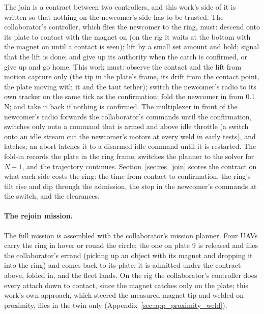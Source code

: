 The join is a contract between two controllers, and this work's side of it is written so that nothing on the
newcomer's side has to be trusted. The collaborator's controller, which flies the newcomer to the ring, must:
descend onto its plate to contact with the magnet on (on the rig it waits at the bottom with the magnet on until a
contact is seen); lift by a small set amount and hold; signal that the lift is done; and give up its authority when
the catch is confirmed, or give up and go home. This work must: observe the contact and the lift from motion capture
only (the tip in the plate's frame, its drift from the contact point, the plate moving with it and the taut
tether); switch the newcomer's radio to its own tracker on the same tick as the confirmation; fold the newcomer in
from 0.1\,N; and take it back if nothing is confirmed. The multiplexer in front of the newcomer's radio forwards the
collaborator's commands until the confirmation, switches only onto a command that is armed and above idle throttle
(a switch onto an idle stream cut the newcomer's motors at every weld in early tests), and latches; an abort latches
it to a disarmed idle command until it is restarted. The fold-in records the plate in the ring frame, switches the
planner to the solver for $N+1$, and the trajectory continues. Section~\ref{sec:res_join} scores the contract on what
each side costs the ring: the time from contact to confirmation, the ring's tilt rise and dip through the admission,
the step in the newcomer's commands at the switch, and the clearances.

\paragraph{The rejoin mission.} The full mission is assembled with the collaborator's mission planner. Four UAVs
carry the ring in hover or round the circle; the one on plate 9 is released and flies the collaborator's errand
(picking up an object with its magnet and dropping it into the ring) and comes back to its plate; it is admitted
under the contract above, folded in, and the fleet lands. On the rig the collaborator's controller does every
attach down to contact, since the magnet catches only on the plate; this work's own approach, which steered the
measured magnet tip and welded on proximity, flies in the twin only (Appendix~\ref{sec:app_proximity_weld}).

